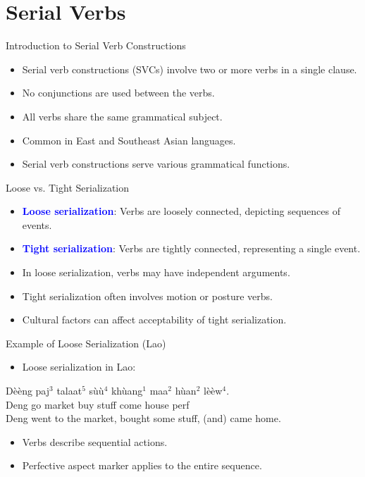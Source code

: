 \documentclass{beamer}
\newcommand{\txx}[1]{\textcolor{blue}{\textbf{#1}}}
\begin{document}
\section{Serial Verbs}

\begin{frame}{Introduction to Serial Verb Constructions}
\begin{itemize}
    \item Serial verb constructions (SVCs) involve two or more verbs in a single clause.
    \item No conjunctions are used between the verbs.
    \item All verbs share the same grammatical subject.
    \item Common in East and Southeast Asian languages.
    \item Serial verb constructions serve various grammatical functions.
\end{itemize}
\end{frame}

\begin{frame}{Loose vs. Tight Serialization}
\begin{itemize}
    \item \txx{Loose serialization}: Verbs are loosely connected, depicting sequences of events.
    \item \txx{Tight serialization}: Verbs are tightly connected, representing a single event.
    \item In loose serialization, verbs may have independent arguments.
    \item Tight serialization often involves motion or posture verbs.
    \item Cultural factors can affect acceptability of tight serialization.
\end{itemize}
\end{frame}

\begin{frame}{Example of Loose Serialization (Lao)}
\begin{itemize}
    \item Loose serialization in Lao:
\end{itemize}
\begin{exe}
\ex
\gll Dèèng paj$^3$ talaat$^5$ sùù$^4$ khùang$^1$ maa$^2$ hùan$^2$ lèèw$^4$. \\
    Deng go market buy stuff come house perf \\
\trans Deng went to the market, bought some stuff, (and) came home. \\
\end{exe}
\begin{itemize}
    \item Verbs describe sequential actions.
    \item Perfective aspect marker applies to the entire sequence.
\end{itemize}
\end{frame}
\end{document}
